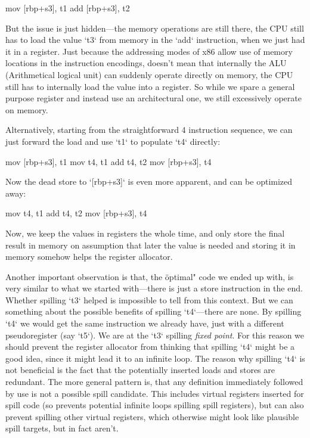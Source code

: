 \begtt
mov [rbp+s3], t1
add [rbp+s3], t2
\endtt

But the issue is just hidden---the memory operations are still
there, the CPU still has to load the value `t3` from memory in the `add`
instruction, when we just had it in a register. Just because the addressing
modes of x86 allow use of memory locations in the instruction encodings, doesn't
mean that internally the ALU (Arithmetical logical unit) can suddenly operate
directly on memory, the CPU still has to internally load the value into a
register. So while we spare a general purpose register and instead use an
architectural one, we still excessively operate on memory.

Alternatively, starting from the straightforward 4 instruction sequence, we can
just forward the load and use `t1` to populate `t4` directly:

\begtt
mov [rbp+s3], t1
mov t4, t1
add t4, t2
mov [rbp+s3], t4
\endtt

Now the dead store to `[rbp+s3]` is even more apparent, and can be optimized
away:

\begtt
mov t4, t1
add t4, t2
mov [rbp+s3], t4
\endtt

Now, we keep the values in registers the whole time, and only store the final
result in memory on assumption that later the value is needed and storing it in
memory somehow helps the register allocator.

Another important observation is that, the \"optimal" code we ended up with, is
very similar to what we started with---there is just a store instruction in the
end. Whether spilling `t3` helped is impossible to tell from this context. But
we can something about the possible benefits of spilling `t4`---there are none.
By spilling `t4` we would get the same instruction we already have, just with a
different pseudoregister (say `t5`). We are at the `t3` spilling {\em fixed
point}. For this reason we should prevent the register allocator from thinking
that spilling `t4` might be a good idea, since it might lead it to an infinite
loop. The reason why spilling `t4` is not beneficial is the fact that the potentially
inserted loads and stores are redundant. The more general pattern is, that any
definition immediately followed by use is not a possible spill candidate. This includes
virtual registers inserted for spill code (so prevents potential infinite loops
spilling spill registers), but can also prevent spilling other virtual
registers, which otherwise might look like plausible spill targets, but in fact
aren't.

